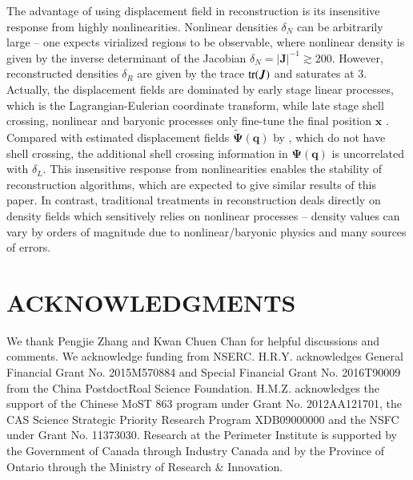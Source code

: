 \documentclass[aps,prd,twocolumn,superscriptaddress,amsfont,amssymb,amsmath,nofootinbib,showpacs,balancelastpage]{revtex4-1}
\newcommand{\bs}{\boldsymbol}
\begin{document}
The advantage of using displacement field in reconstruction is
its insensitive response from highly nonlinearities.
Nonlinear densities $\delta_N$ can be arbitrarily large --
one expects virialized regions to be observable, where nonlinear
density is given by the inverse determinant of the Jacobian
$\delta_N=|\bs J|^{-1}\gtrsim 200$.
However, reconstructed densities $\delta_R$ are given by
the trace $\rm{tr}(\bs J)$ and saturates at 3.
Actually, the displacement fields are dominated by early stage linear processes,
which is the Lagrangian-Eulerian coordinate transform,
while late stage shell crossing, nonlinear and baryonic processes
only fine-tune the final position $\bs x$
\citep{2014PhRvD..89h3515C}. Compared with estimated displacement fields $\tilde{\bs \Psi}(\bs q)$
by \cite{1995ApJS..100..269P}, which do not have shell crossing,
the additional shell crossing information in $\bs\Psi(\bs q)$
is uncorrelated with $\delta_L$. This insensitive response from
nonlinearities enables the stability of reconstruction algorithms,
which are expected to give similar results of this paper.
In contrast, traditional
treatments in reconstruction deals directly on density fields which sensitively
relies on nonlinear processes --  density values can vary by orders
of magnitude due to nonlinear/baryonic physics and many sources of errors.



\section*{ACKNOWLEDGMENTS}
We thank Pengjie Zhang and Kwan Chuen Chan for helpful discussions and comments.
We acknowledge funding from NSERC.
H.R.Y. acknowledges General Financial Grant No. 2015M570884 and Special Financial Grant No. 2016T90009 from the China PostdoctRoal Science Foundation.
H.M.Z. acknowledges the support of the Chinese MoST 863 program under Grant
No. 2012AA121701, the CAS Science Strategic Priority Research Program
XDB09000000 and the NSFC under Grant No. 11373030.
Research at the Perimeter Institute is supported by the Government of Canada
through Industry Canada and by the Province of Ontario through the Ministry of
Research $\&$ Innovation.

%


\end{document}
